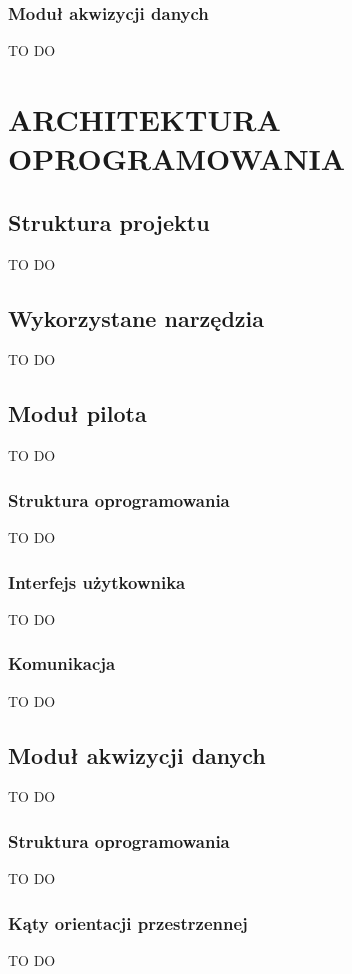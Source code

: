 \documentclass[a4paper, 12pt, twoside]{article}
\begin{document}
\subsubsection{Moduł akwizycji danych}
TO DO 


\newpage
\vspace*{1.5 cm}
\section{ARCHITEKTURA OPROGRAMOWANIA}
\vspace{3.0 cm}

\vspace{1.0 cm}

\subsection{Struktura projektu}
TO DO

\subsection{Wykorzystane narzędzia}
TO DO

\subsection{Moduł pilota}
TO DO

\subsubsection{Struktura oprogramowania}
TO DO

\subsubsection{Interfejs użytkownika}
TO DO
\subsubsection{Komunikacja}
TO DO

\subsection{Moduł akwizycji danych}
TO DO
\subsubsection{Struktura oprogramowania}
TO DO
\subsubsection{Kąty orientacji przestrzennej}
TO DO
\end{document}

